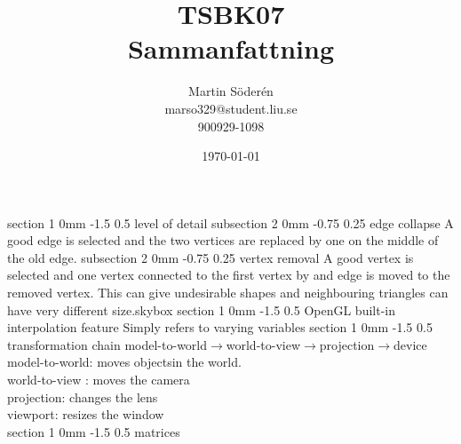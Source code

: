 \documentclass[a4paper,11pt]{article}
\makeatletter
\renewcommand{\section}{\@startsection
   {section}%
   {1}%
   {0mm}%
   {-1.5\baselineskip}%
   {0.5\baselineskip}%
   {\sffamily\bfseries\upshape\normalsize}}%
\renewcommand{\subsection}{\@startsection
   {subsection}%
   {2}%
   {0mm}%
   {-0.75\baselineskip}%
   {0.25\baselineskip}%
   {\rmfamily\normalfont\slshape\normalsize}}%
\makeatother
\begin{document}
\begin{titlepage}
\title{TSBK07\\
Sammanfattning}
\author{Martin Söderén\\ marso329@student.liu.se\\900929-1098}
\date{\today}
\maketitle




\vfill %

\thispagestyle{empty}

\end{titlepage}

\section{level of detail}
\subsection{edge collapse}
A good edge is selected and the two vertices are replaced by one on the middle of the old edge. 
\subsection{vertex removal}
A good vertex is selected and one vertex connected to the first vertex by and edge is moved to the removed vertex. This can give undesirable shapes and neighbouring triangles can have very different size.skybox
\section{OpenGL built-in interpolation feature}
Simply refers to varying variables
\section{transformation chain}
model-to-world$\rightarrow$world-to-view$\rightarrow$projection$\rightarrow$device
\\
model-to-world: moves objectsin the world.\\
world-to-view : moves the camera\\
projection: changes the lens\\
viewport: resizes the window\\
\section{matrices}
\end{document}
